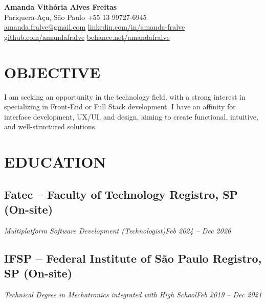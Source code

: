\documentclass[a4paper,10pt]{article}
\begin{document}
\begin{center}
    {\LARGE \textbf{Amanda Vithória Alves Freitas}}\\[0.1cm]
    Pariquera-Açu, São Paulo \hspace{1mm} {\textbullet} \hspace{1mm} +55 13 99727-6945
    \\[0.2cm] 
    \href{mailto:amanda.fralve@gmail.com}{amanda.fralve@gmail.com}
    \hspace{1mm}{\textbullet}\hspace{1mm}
    \href{https://www.linkedin.com/in/amanda-fralve}{linkedin.com/in/amanda-fralve}
    \hspace{1mm}{\textbullet}\hspace{1mm}
    \href{https://github.com/amandafralve}{github.com/amandafralve}
    \hspace{1mm}{\textbullet}\hspace{1mm}
    \href{https://www.behance.net/amandafralve}{behance.net/amandafralve}
\end{center}


\section{OBJECTIVE}
    I am seeking an opportunity in the technology field, with a strong interest in specializing in Front-End or Full Stack development. I have an affinity for interface development, UX/UI, and design, aiming to create functional, intuitive, and well-structured solutions.
\section{EDUCATION}
    \subsection*{\texorpdfstring{
            \textbf{Fatec – Faculty of Technology} \hfill Registro, SP (On-site)
        }{
            Fatec Registro (Education) -- Location
        }}
    \textit{Multiplatform Software Development (Technologist)\hfill Feb 2024 – Dec 2026}

    \subsection*{\texorpdfstring{
            \textbf{IFSP – Federal Institute of São Paulo} \hfill Registro, SP (On-site)
        }{
            IFSP Registro (Education) -- Location
        }}
    \textit{Technical Degree in Mechatronics integrated with High School\hfill Feb 2019 – Dec 2021}
\end{document}
